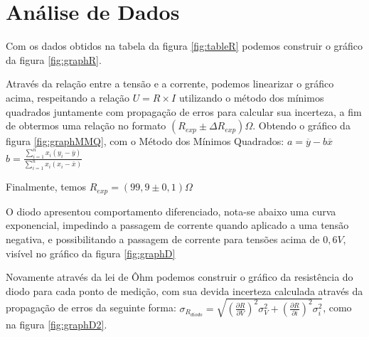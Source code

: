 \section{Análise de Dados}
    Com os dados obtidos na tabela da figura \ref{fig:tableR} podemos construir o gráfico da figura \ref{fig:graphR}.

    Através da relação entre a tensão e a corrente, podemos linearizar o gráfico acima, respeitando a relação $U = R\times I$
    utilizando o método dos mínimos quadrados juntamente com propagação de erros para calcular sua incerteza, a fim de obtermos
    uma relação no formato $(R_{exp}\pm \Delta R_{exp})\Omega$. Obtendo o gráfico da figura \ref{fig:graphMMQ}, com o Método dos Mínimos Quadrados:
    \newline
    $a = \overline{y} - b\overline{x}$ 
    \newline
    $b = \frac{\sum_{i=1}^{n}x_i(y_i-\overline{y})}{\sum_{i=1}^{n}x_i(x_i-\overline{x})}$ 
    \newline

    Finalmente, temos $R_{exp} = (99,9\pm 0,1)\Omega$

    O diodo apresentou comportamento diferenciado, nota-se abaixo uma curva exponencial, impedindo a passagem de corrente quando
    aplicado a uma tensão negativa, e possibilitando a passagem de corrente para tensões acima de $0,6V$, visível no gráfico da figura \ref{fig:graphD}

    Novamente através da lei de Ôhm podemos construir o gráfico da resistência do diodo para cada ponto de medição, com sua devida
    incerteza calculada através da propagação de erros da seguinte forma:
    $\sigma_{R_{diodo}}=\sqrt{(\frac{\partial R}{\partial V})^2 \sigma_{V}^2 + (\frac{\partial R}{\partial i})^2 \sigma_{i}^2} $, 
    como na figura \ref{fig:graphD2}.

